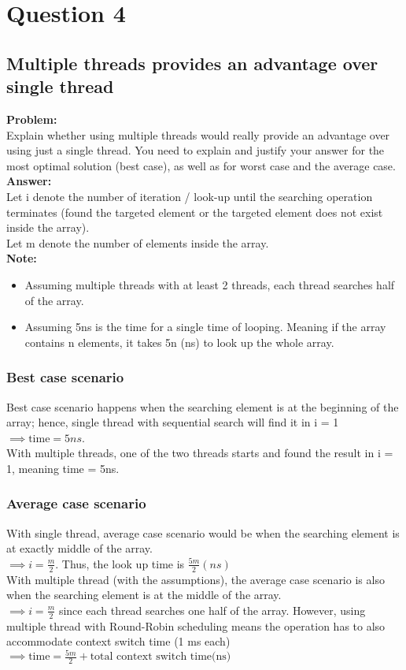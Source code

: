 \newpage
\section{Question 4}

\subsection{Multiple threads provides an advantage over single thread}
\textbf{Problem:} \\
Explain whether using multiple threads would really provide an advantage over using just a
single thread. You need to explain and justify your answer for the most optimal solution (best
case), as well as for worst case and the average case. \\

\textbf{Answer:} \\
Let i denote the number of iteration / look-up until the searching operation terminates (found the targeted element or the targeted element does not exist inside the array). \\
Let m denote the number of elements inside the array. \\
\textbf{Note:} 
\begin{itemize}
    \item Assuming multiple threads with at least 2 threads, each thread searches half of the array.
    \item Assuming 5ns is the time for a single time of looping. Meaning if the array contains n elements, it takes 5n (ns) to look up the whole array.
\end{itemize}

\subsubsection{Best case scenario}
Best case scenario happens when the searching element is at the beginning of the array; hence, single thread with sequential search will find it in i = 1 $\implies \text{time} = 5ns$. \\
With multiple threads, one of the two threads starts and found the result in i = 1, meaning time = 5ns.

\subsubsection{Average case scenario}
With single thread, average case scenario would be when the searching element is at exactly middle of the array. \\
$\implies i = \frac{m}{2}$. Thus, the look up time is $\frac{5m}{2} (ns)$  \\
With multiple thread (with the assumptions), the average case scenario is also when the searching element is at the middle of the array. \\
$\implies i = \frac{m}{2}$ since each thread searches one half of the array. However, using multiple thread with Round-Robin scheduling means the operation has to also accommodate context switch time (1 ms each) \\
$\implies \text{time} = \frac{5m}{2} + \text{total context switch time}  \text{(ns)} $\\

